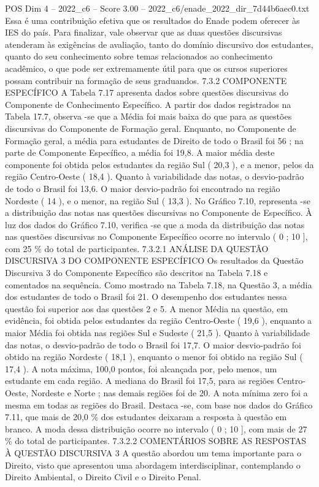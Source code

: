 \begin{textsample}{POS Dim 4 – 2022\_c6 – Score 3.00 – 2022\_c6/enade\_2022\_dir\_7d44b6aec0.txt}
Essa é uma contribuição efetiva que os resultados do Enade podem oferecer às IES do país.
Para finalizar, vale observar que as duas questões discursivas atenderam às exigências de avaliação, tanto do domínio discursivo dos estudantes, quanto do seu conhecimento sobre temas relacionados ao conhecimento acadêmico, o que pode ser extremamente útil para que os cursos superiores possam contribuir na formação de seus graduandos. 7.3.2 COMPONENTE ESPECÍFICO A Tabela 7.17 apresenta dados sobre questões discursivas do Componente de Conhecimento Específico.
A partir dos dados registrados na Tabela 17.7, observa -se que a Média foi mais baixa do que para as questões discursivas do Componente de Formação geral.
Enquanto, no Componente de Formação geral, a média para estudantes de Direito de todo o Brasil foi 56 ; na parte de Componente Específico, a média foi 19,8.
A maior média deste componente foi obtida pelos estudantes da região Sul ( 20,3 ), e a menor, pelos da região Centro-Oeste ( 18,4 ).
Quanto à variabilidade das notas, o desvio-padrão de todo o Brasil foi 13,6.
O maior desvio-padrão foi encontrado na região Nordeste ( 14 ), e o menor, na região Sul ( 13,3 ).
No Gráfico 7.10, representa -se a distribuição das notas nas questões discursivas no Componente de Específico.
À luz dos dados do Gráfico 7.10, verifica -se que a moda da distribuição das notas nas questões discursivas no Componente Específico ocorre no intervalo ( 0 ; 10 ], com 25 \% do total de participantes. 7.3.2.1 ANÁLISE DA QUESTÃO DISCURSIVA 3 DO COMPONENTE ESPECÍFICO Os resultados da Questão Discursiva 3 do Componente Específico são descritos na Tabela 7.18 e comentados na sequência.
Como mostrado na Tabela 7.18, na Questão 3, a média dos estudantes de todo o Brasil foi 21.
O desempenho dos estudantes nessa questão foi superior aos das questões 2 e 5.
A menor Média na questão, em evidência, foi obtida pelos estudantes da região Centro-Oeste ( 19,6 ), enquanto a maior Média foi obtida nas regiões Sul e Sudeste ( 21,5 ).
Quanto à variabilidade das notas, o desvio-padrão de todo o Brasil foi 17,7.
O maior desvio-padrão foi obtido na região Nordeste ( 18,1 ), enquanto o menor foi obtido na região Sul ( 17,4 ).
A nota máxima, 100,0 pontos, foi alcançada por, pelo menos, um estudante em cada região.
A mediana do Brasil foi 17,5, para as regiões Centro-Oeste, Nordeste e Norte ; nas demais regiões foi de 20.
A nota mínima zero foi a mesma em todas as regiões do Brasil.
Destaca -se, com base nos dados do Gráfico 7.11, que mais de 20,0 \% dos estudantes deixaram a resposta à questão em branco.
A moda dessa distribuição ocorre no intervalo ( 0 ; 10 ], com mais de 27 \% do total de participantes. 7.3.2.2 COMENTÁRIOS SOBRE AS RESPOSTAS À QUESTÃO DISCURSIVA 3 A questão abordou um tema importante para o Direito, visto que apresentou uma abordagem interdisciplinar, contemplando o Direito Ambiental, o Direito Civil e o Direito Penal.

\end{textsample}
